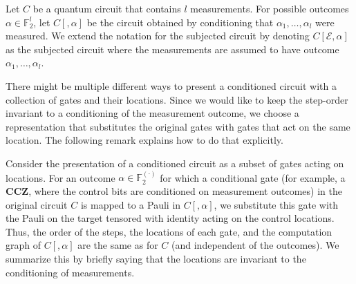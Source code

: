 \begin{definition}
  Let $C$ be a quantum circuit that contains $l$ measurements. For possible outcomes $\alpha \in \mathbb{F}^{l}_{2}$, let $C[,\alpha]$ be the circuit obtained by conditioning that $\alpha_{1},\ldots,\alpha_{l}$ were measured. We extend the notation for the subjected circuit by denoting $C[\mathcal{E},\alpha]$ as the subjected circuit where the measurements are assumed to have outcome $\alpha_{1},\ldots,\alpha_{l}$.
\end{definition}

There might be multiple different ways to present a conditioned circuit with a collection of gates and their locations. Since we would like to keep the step-order invariant to a conditioning of the measurement outcome, we choose a representation that substitutes the original gates with gates that act on the same location. The following remark explains how to do that explicitly.
\begin{remark}
  \label{remark:condmeas}
  Consider the presentation of a conditioned circuit as a subset of gates acting on locations. For an outcome $\alpha \in \mathbb{F}_{2}^{(\cdot)}$ for which a conditional gate (for example, a $\mathbf{CCZ}$, where the control bits are conditioned on measurement outcomes) in the original circuit $C$ is mapped to a Pauli in $C[,\alpha]$, we substitute this gate with the Pauli on the target tensored with identity acting on the control locations. Thus, the order of the steps, the locations of each gate, and the computation graph of $C[,\alpha]$ are the same as for $C$ (and independent of the outcomes). We summarize this by briefly saying that the locations are invariant to the conditioning of measurements. 
\end{remark}

